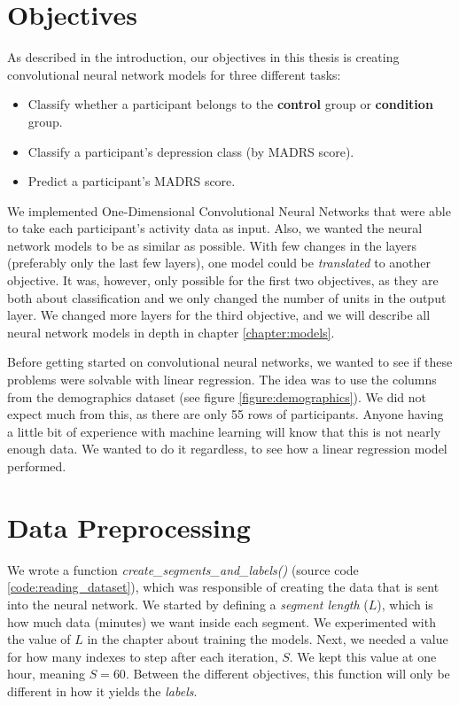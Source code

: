 \section{Objectives}

As described in the introduction, our objectives in this thesis is creating convolutional neural network models for three different tasks:

\begin{itemize}
  \item Classify whether a participant belongs to the \textbf{control} group or \textbf{condition} group.
  \item Classify a participant's depression class (by MADRS score).
  \item Predict a participant's MADRS score.
\end{itemize}

We implemented One-Dimensional Convolutional Neural Networks that were able to take each participant's activity data as input. Also, we wanted the neural network models to be as similar as possible. With few changes in the layers (preferably only the last few layers), one model could be \textit{translated} to another objective. It was, however, only possible for the first two objectives, as they are both about classification and we only changed the number of units in the output layer. We changed more layers for the third objective, and we will describe all neural network models in depth in chapter \ref{chapter:models}.

Before getting started on convolutional neural networks, we wanted to see if these problems were solvable with linear regression. The idea was to use the columns from the demographics dataset (see figure \ref{figure:demographics}). We did not expect much from this, as there are only 55 rows of participants. Anyone having a little bit of experience with machine learning will know that this is not nearly enough data. We wanted to do it regardless, to see how a linear regression model performed.

\section{Data Preprocessing}

We wrote a function \textit{create\_segments\_and\_labels()} (source code \ref{code:reading_dataset}), which was responsible of creating the data that is sent into the neural network. We started by defining a \textit{segment length} ($L$), which is how much data (minutes) we want inside each segment. We experimented with the value of $L$ in the chapter about training the models. Next, we needed a value for how many indexes to step after each iteration, $S$. We kept this value at one hour, meaning $S=60$. Between the different objectives, this function will only be different in how it yields the \textit{labels}.

